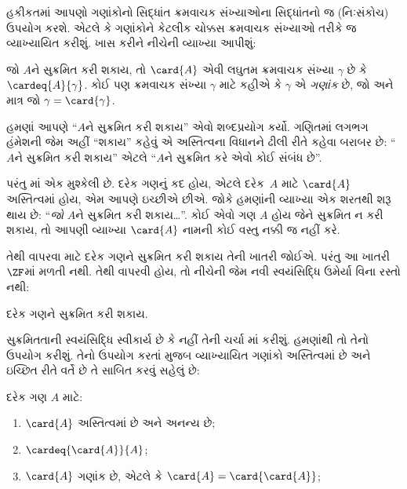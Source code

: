 \documentclass[../../../include/open-logic-section]{subfiles}
\begin{document}

હકીકતમાં આપણો ગણાંકોનો સિદ્ધાંત ક્રમવાચક સંખ્યાઓના
સિદ્ધાંતનો જ (નિઃસંકોચ) ઉપયોગ કરશે. એટલે કે ગણાંકોને
કેટલીક ચોક્કસ ક્રમવાચક સંખ્યાઓ તરીકે જ વ્યાખ્યાયિત કરીશું.
ખાસ કરીને નીચેની વ્યાખ્યા આપીશું:

\begin{defn}
જો $A$ને સુક્રમિત કરી શકાય, તો $\card{A}$ એવી લઘુતમ
ક્રમવાચક સંખ્યા $\gamma$ છે કે $\cardeq{A}{\gamma}$.
કોઈ પણ ક્રમવાચક સંખ્યા $\gamma$ માટે કહીએ કે $\gamma$
એ \emph{ગણાંક} છે, જો અને માત્ર જો
$\gamma = \card{\gamma}$.
\end{defn}

હમણાં આપણે ``$A$ને સુક્રમિત કરી શકાય'' એવો શબ્દપ્રયોગ
કર્યો. ગણિતમાં લગભગ હંમેશની જેમ અહીં ``શકાય'' કહેવું
એ અસ્તિત્વના વિધાનને ઢીલી રીતે કહેવા બરાબર છે:
``$A$ને સુક્રમિત કરી શકાય'' એટલે ``$A$ને સુક્રમિત
કરે એવો કોઈ સંબંધ છે''.

પરંતુ માં એક મુશ્કેલી છે.
દરેક ગણનું કદ હોય, એટલે દરેક~$A$ માટે $\card{A}$
અસ્તિત્વમાં હોય, એમ આપણે ઇચ્છીએ છીએ. જોકે હમણાંની
વ્યાખ્યા એક શરતથી શરૂ થાય છે: ``\emph{જો} $A$ને
સુક્રમિત કરી શકાય\ldots''. કોઈ એવો ગણ $A$ હોય
જેને સુક્રમિત ન કરી શકાય, તો આપણી વ્યાખ્યા
$\card{A}$ નામની કોઈ વસ્તુ નક્કી જ નહીં કરે.

તેથી  વાપરવા માટે
દરેક ગણને સુક્રમિત કરી શકાય તેની ખાતરી જોઈએ.
પરંતુ આ ખાતરી~$\ZF$માં મળતી નથી. તેથી
વાપરવી હોય, તો નીચેની જેમ નવી સ્વયંસિદ્ધિ ઉમેર્યા
વિના રસ્તો નથી:
\begin{axiom}[સુક્રમિતતા]
દરેક ગણને સુક્રમિત કરી શકાય.
\end{axiom}
સુક્રમિતતાની સ્વયંસિદ્ધિ સ્વીકાર્ય છે કે નહીં તેની
ચર્ચા માં કરીશું. હમણાંથી તો
તેનો ઉપયોગ કરીશું. તેનો ઉપયોગ કરતાં
 મુજબ વ્યાખ્યાયિત
ગણાંકો અસ્તિત્વમાં છે અને ઇચ્છિત રીતે વર્તે છે તે
સાબિત કરવું સહેલું છે:

\begin{lem}
દરેક ગણ $A$ માટે:
\begin{enumerate}
	\item{} $\card{A}$ અસ્તિત્વમાં છે અને અનન્ય છે;
	\item{}  $\cardeq{\card{A}}{A}$;
	\item{}  $\card{A}$ ગણાંક છે, એટલે કે
	$\card{A} = \card{\card{A}}$;
\end{enumerate}
\end{lem}
\end{document}
